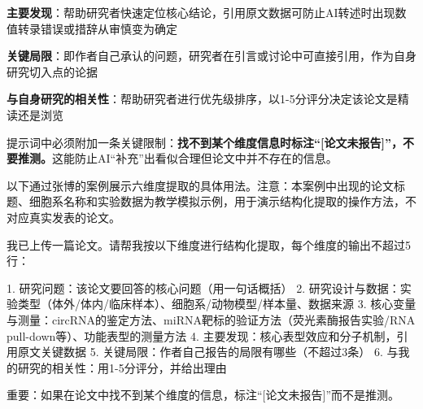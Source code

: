 \textbf{主要发现}：帮助研究者快速定位核心结论，引用原文数据可防止AI转述时出现数值转录错误或措辞从审慎变为确定

\textbf{关键局限}：即作者自己承认的问题，研究者在引言或讨论中可直接引用，作为自身研究切入点的论据

\textbf{与自身研究的相关性}：帮助研究者进行优先级排序，以1-5分评分决定该论文是精读还是浏览

提示词中必须附加一条关键限制：\textbf{找不到某个维度信息时标注``[论文未报告]''，不要推测。}这能防止AI``补充''出看似合理但论文中并不存在的信息。

以下通过张博的案例展示六维度提取的具体用法。注意：本案例中出现的论文标题、细胞系名称和实验数据为教学模拟示例，用于演示结构化提取的操作方法，不对应真实发表的论文。

\begin{userbox}
我已上传一篇论文。请帮我按以下维度进行结构化提取，每个维度的输出不超过5行：

1. 研究问题：该论文要回答的核心问题（用一句话概括）
2. 研究设计与数据：实验类型（体外/体内/临床样本）、细胞系/动物模型/样本量、数据来源
3. 核心变量与测量：circRNA的鉴定方法、miRNA靶标的验证方法（荧光素酶报告实验/RNA pull-down等）、功能表型的测量方法
4. 主要发现：核心表型效应和分子机制，引用原文关键数据
5. 关键局限：作者自己报告的局限有哪些（不超过3条）
6. 与我的研究的相关性：用1-5分评分，并给出理由

重要：如果在论文中找不到某个维度的信息，标注``[论文未报告]''而不是推测。
\end{userbox}


